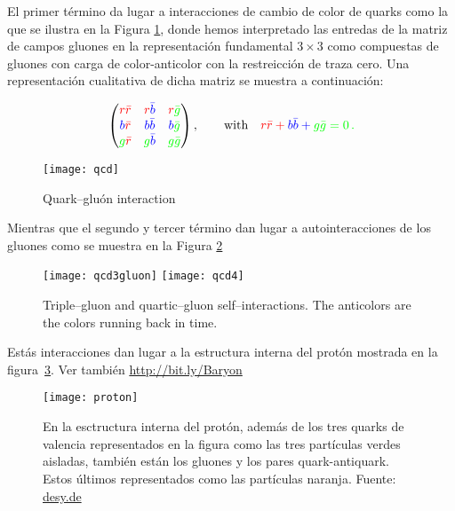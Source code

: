 El primer término da lugar a interacciones de cambio de color de quarks como la que se ilustra en la Figura \ref{fig:qcd}, donde hemos interpretado las entredas de la matriz de campos gluones en la representación fundamental $3\times3$ como compuestas de gluones con carga de color-anticolor con la restreicción de traza cero. Una representación cualitativa de dicha matriz se muestra a continuación:
\begin{frame}  
    \begin{align}
\label{eq:glu}
      \begin{pmatrix}
        \color{red}{r\bar{r}} & \color{red}{r}\color{blue}\bar{b} &\color{red}{r}\color{green}\bar{g}\\ 
        \color{blue}{b}\color{red}{\bar{r}} & \color{blue}{b\bar{b}} &\color{blue}{b}\color{green}{\bar{g}}\\ 
        \color{green}{g}\color{red}{\bar{r}} & \color{green}g\color{blue}{\bar{b}} &\color{green}{g\bar{g}}\\ 
      \end{pmatrix},\qquad\text{with}\quad 
      \color{red}{r\bar{r}}+\color{blue}{b\bar{b}}+\color{green}{g\bar{g}}=0\,.
    \end{align}

\begin{figure}
  \centering
  \texttt{[image: qcd]} %
  \caption{Quark--gluón interaction}
  \label{fig:qcd}
\end{figure}
\end{frame}
Mientras que el segundo y tercer término dan lugar a autointeracciones de los gluones como se muestra en la Figura \ref{fig:qcd3gluon}
\begin{frame}
\begin{figure}
  \centering
  \texttt{[image: qcd3gluon]} \texttt{[image: qcd4]} %
  \caption{Triple--gluon and quartic--gluon self--interactions. The anticolors are the colors running back in time.}
  \label{fig:qcd3gluon}
\end{figure}
\end{frame}

Estás interacciones dan lugar a la estructura interna del protón mostrada en la figura~\ref{fig:prt}. Ver también \url{http://bit.ly/Baryon}

\begin{frame}
  \begin{figure}
    \centering
  \texttt{[image: proton]}    
    \caption{En la esctructura interna del protón, además de los tres quarks de valencia representados en la figura como las tres partículas verdes aisladas, también están los gluones y los pares quark-antiquark. Estos últimos representados como las partículas naranja. Fuente: \href{http://www.desy.de/news/news_search/index_eng.html?openDirectAnchor=829}{desy.de}}
    \label{fig:prt}
  \end{figure}

\end{frame}

